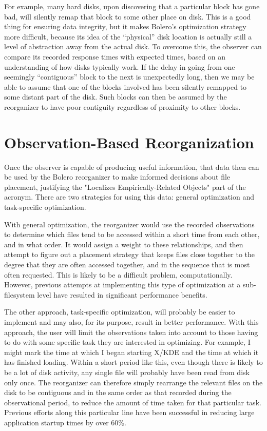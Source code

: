 \documentclass[10pt,twocolumn]{article}
\begin{document}
For example, many hard disks, upon discovering that a particular block has gone bad, will silently
remap that block to some other place on disk\cite{remapping}. This is a good thing for ensuring
data integrity, but it makes Bolero's optimization strategy more difficult, because
its idea of the ``physical'' disk location is actually still a level of abstraction away from
the actual disk. To overcome this, the observer can compare its recorded response
times with expected times, based on an understanding of how disks typically work.
If the delay in going from one seemingly ``contiguous'' block to the next
is unexpectedly long, then we may be able to assume that one of the blocks involved
has been silently remapped to some distant part of the disk. Such blocks can then be
assumed by the reorganizer to have poor contiguity regardless of proximity to other
blocks.

\section{Observation-Based Reorganization}

Once the observer is capable of producing useful information, that data then can be used
by the Bolero reorganizer to make informed decisions about file placement, justifying the
"Localizes Empirically-Related Objects" part of the acronym. There are two
strategies for using this data: general optimization and task-specific optimization.

With general optimization, the reorganizer would use the recorded observations
to determine which files tend to be accessed within a short time from each
other, and in what order. It would assign a weight to these relationships, and then
attempt to figure out a placement strategy that keeps files close together to
the degree that they are often accessed together, and in the sequence that is
most often requested. This is likely to be a difficult problem, computationally.
However, previous attempts at implementing this type of optimization at a
sub-filesystem level have resulted in significant performance benefits\cite{autolocality}.

The other approach, task-specific optimization, will probably be easier to
implement and may also, for its purpose, result in better performance. With this
approach, the user will limit the observations taken into account to those having to
do with some specific task they are interested in optimizing. For example,
I might mark the time at which I began starting X/KDE and the time at
which it has finished loading. Within a short period like this, even
though there is likely to be a lot of disk activity, any single file will
probably have been read from disk only once. The reorganizer can therefore simply
rearrange the relevant files on the disk to be contiguous and in the same order as that
recorded during the observational period, to reduce the amount of time taken for
that particular task. Previous efforts along this particular line have been
successful in reducing large application startup times by over 60\%\cite{ala}.
\end{document}
